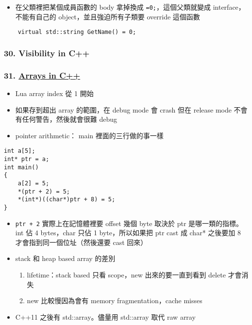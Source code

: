 \documentclass[11pt]{article}
\providecommand{\tightlist}{%
      \setlength{\itemsep}{0pt}\setlength{\parskip}{0pt}}
\begin{document}
\begin{itemize}
\tightlist
\item
  在父類裡把某個成員函數的 body 拿掉換成 \texttt{=0;}，這個父類就變成
  interface，不能有自己的 object，並且強迫所有子類要 override 這個函數
\end{itemize}

\begin{verbatim}
    virtual std::string GetName() = 0;
\end{verbatim}

\hypertarget{visibility-in-c}{%
\subsubsection{30. Visibility in C++}\label{visibility-in-c}}

\hypertarget{arrays-in-c}{%
\subsubsection{\texorpdfstring{31.
\href{https://www.youtube.com/watch?v=ENDaJi08jCU\&list=PLlrATfBNZ98dudnM48yfGUldqGD0S4FFb\&index=32\&t=0s}{Arrays
in C++}}{31. Arrays in C++}}\label{arrays-in-c}}

\begin{itemize}
\tightlist
\item
  Lua array index 從 1 開始
\item
  如果存到超出 array 的範圍，在 debug mode 會 crash 但在 release mode
  不會有任何警告，然後就會很難 debug
\item
  pointer arithmetic： main 裡面的三行做的事一樣
\end{itemize}

\begin{verbatim}
int a[5];
int* ptr = a;
int main()
{
    a[2] = 5;
    *(ptr + 2) = 5;
    *(int*)((char*)ptr + 8) = 5;
}
\end{verbatim}

\begin{itemize}
\tightlist
\item
  \texttt{ptr\ +\ 2} 實際上在記憶體裡要 offset 幾個 byte 取決於 ptr
  是哪一類的指標。int 佔 4 bytes，char 只佔 1 byte，所以如果把 ptr cast
  成 char* 之後要加 8 才會指到同一個位址（然後還要 cast 回來）
\item
  stack 和 heap based array 的差別

  \begin{enumerate}
  \def\labelenumi{\arabic{enumi}.}
  \tightlist
  \item
    lifetime：stack based 只看 scope，new 出來的要一直到看到 delete
    才會消失
  \item
    new 比較慢因為會有 memory fragmentation，cache misses
  \end{enumerate}
\item
  C++11 之後有 std::array。儘量用 std::array 取代 raw array
\end{itemize}
\end{document}
